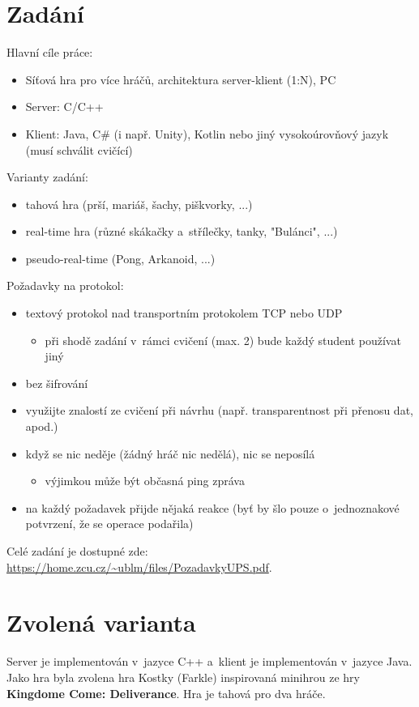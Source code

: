 \documentclass[12pt, a4paper]{article}
\begin{document}
\section{Zadání}
Hlavní cíle práce:
\begin{itemize}
    \item Síťová hra pro více hráčů, architektura server-klient (1:N), PC
    \item Server: C/C++
    \item Klient: Java, C\# (i např. Unity), Kotlin nebo jiný vysokoúrovňový jazyk (musí schválit cvičící)
\end{itemize}
Varianty zadání:
\begin{itemize}
    \item tahová hra (prší, mariáš, šachy, piškvorky, ...)
    \item real-time hra (různé skákačky a~střílečky, tanky, "Bulánci", ...)
    \item pseudo-real-time (Pong, Arkanoid, ...)
\end{itemize}

Požadavky na protokol:
\begin{itemize}
    \item textový protokol nad transportním protokolem TCP nebo UDP
    \begin{itemize}
        \item při shodě zadání v~rámci cvičení (max. 2) bude každý student používat jiný
    \end{itemize}
    \item bez šifrování
    \item využijte znalostí ze cvičení při návrhu (např. transparentnost při přenosu dat, apod.)
    \item když se nic neděje (žádný hráč nic nedělá), nic se neposílá
    \begin{itemize}
        \item výjimkou může být občasná ping zpráva
    \end{itemize}
    \item na každý požadavek přijde nějaká reakce (byť by šlo pouze o~jednoznakové potvrzení, že se operace podařila)
\end{itemize}

Celé zadání je dostupné zde: \\ \url{https://home.zcu.cz/~ublm/files/PozadavkyUPS.pdf}.

\section{Zvolená varianta}
Server je implementován v~jazyce C++ a~klient je implementován v~jazyce Java. 
Jako hra byla zvolena hra Kostky (Farkle) inspirovaná minihrou ze hry \textbf{Kingdome Come: Deliverance}. 
Hra je tahová pro dva hráče. 
\end{document}

